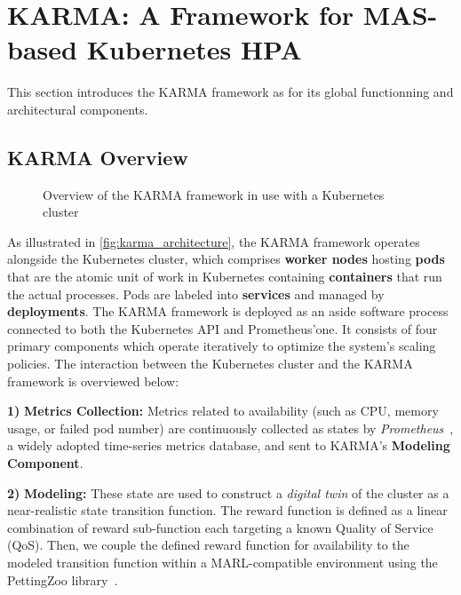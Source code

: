 \documentclass[conference]{IEEEtran}
\begin{document}
\section{KARMA: A Framework for MAS-based Kubernetes HPA}
\label{sec:proposed_approach}

This section introduces the KARMA framework as for its global functionning and architectural components.

\subsection{KARMA Overview}

\begin{figure}[h!]
    \centering
    
    \caption{Overview of the KARMA framework in use with a Kubernetes cluster}
    \label{fig:karma_architecture}
\end{figure}

As illustrated in \autoref{fig:karma_architecture}, the KARMA framework operates alongside the Kubernetes cluster, which comprises \textbf{worker nodes} hosting \textbf{pods} that are the atomic unit of work in Kubernetes containing \textbf{containers} that run the actual processes. Pods are labeled into \textbf{services} and managed by \textbf{deployments}.
%
The KARMA framework is deployed as an aside software process connected to both the Kubernetes API and Prometheus'one. It consists of four primary components which operate iteratively to optimize the system's scaling policies. The interaction between the Kubernetes cluster and the KARMA framework is overviewed below:

\textbf{1)} \textbf{Metrics Collection:} Metrics related to availability (such as CPU, memory usage, or failed pod number) are continuously collected as states by \textit{Prometheus}~\cite{prometheus}, a widely adopted time-series metrics database, and sent to KARMA's \textbf{Modeling Component}.

\textbf{2)} \textbf{Modeling:} These state are used to construct a \textit{digital twin} of the cluster as a near-realistic state transition function. The reward function is defined as a linear combination of reward sub-function each targeting a known Quality of Service (QoS). Then, we couple the defined reward function for availability to the modeled transition function within a MARL-compatible environment using the PettingZoo library~\cite{Terry2021}.
\end{document}
